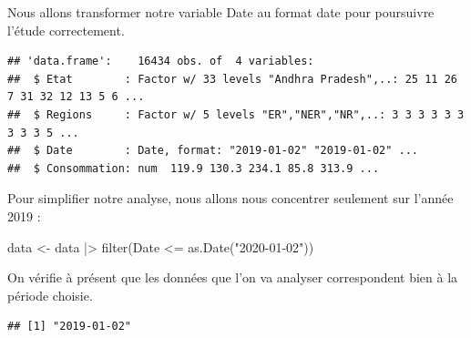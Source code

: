 \documentclass[
]{article}
\newenvironment{Shaded}{\begin{snugshade}}{\end{snugshade}}
\newcommand{\AttributeTok}[1]{\textcolor[rgb]{0.77,0.63,0.00}{#1}}
\newcommand{\CommentTok}[1]{\textcolor[rgb]{0.56,0.35,0.01}{\textit{#1}}}
\newcommand{\FunctionTok}[1]{\textcolor[rgb]{0.00,0.00,0.00}{#1}}
\newcommand{\NormalTok}[1]{#1}
\newcommand{\OtherTok}[1]{\textcolor[rgb]{0.56,0.35,0.01}{#1}}
\newcommand{\SpecialCharTok}[1]{\textcolor[rgb]{0.00,0.00,0.00}{#1}}
\newcommand{\StringTok}[1]{\textcolor[rgb]{0.31,0.60,0.02}{#1}}
\begin{document}
Nous allons transformer notre variable Date au format date pour
poursuivre l'étude correctement.

\begin{Shaded}
\end{Shaded}

\begin{verbatim}
## 'data.frame':    16434 obs. of  4 variables:
##  $ Etat        : Factor w/ 33 levels "Andhra Pradesh",..: 25 11 26 7 31 32 12 13 5 6 ...
##  $ Regions     : Factor w/ 5 levels "ER","NER","NR",..: 3 3 3 3 3 3 3 3 3 5 ...
##  $ Date        : Date, format: "2019-01-02" "2019-01-02" ...
##  $ Consommation: num  119.9 130.3 234.1 85.8 313.9 ...
\end{verbatim}

Pour simplifier notre analyse, nous allons nous concentrer seulement sur
l'année 2019 :

\begin{Shaded}
\begin{Highlighting}[]
\NormalTok{data }\OtherTok{\textless{}{-}}\NormalTok{ data }\SpecialCharTok{|\textgreater{}} 
  \FunctionTok{filter}\NormalTok{(Date }\SpecialCharTok{\textless{}=} \FunctionTok{as.Date}\NormalTok{(}\StringTok{"2020{-}01{-}02"}\NormalTok{))}
\end{Highlighting}
\end{Shaded}

On vérifie à présent que les données que l'on va analyser correspondent
bien à la période choisie.

\begin{Shaded}
\end{Shaded}

\begin{verbatim}
## [1] "2019-01-02"
\end{verbatim}

\begin{Shaded}
\end{Shaded}
\end{document}
